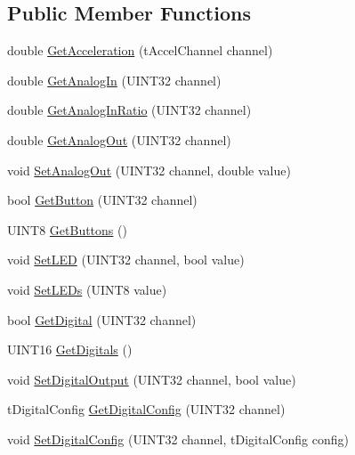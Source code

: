 \subsection*{\-Public \-Member \-Functions}
\begin{DoxyCompactItemize}
\item 
double \hyperlink{classDriverStationEnhancedIO_a594f2ddea855e046abcf50406542a4ca}{\-Get\-Acceleration} (t\-Accel\-Channel channel)
\item 
double \hyperlink{classDriverStationEnhancedIO_a8a4d31fb1c8845f33de2da37c559f016}{\-Get\-Analog\-In} (\-U\-I\-N\-T32 channel)
\item 
double \hyperlink{classDriverStationEnhancedIO_a37c9af7405e84233c47a708be5a3c53a}{\-Get\-Analog\-In\-Ratio} (\-U\-I\-N\-T32 channel)
\item 
double \hyperlink{classDriverStationEnhancedIO_a7cefa1bbdd5c1b7520e0268a17bd75db}{\-Get\-Analog\-Out} (\-U\-I\-N\-T32 channel)
\item 
void \hyperlink{classDriverStationEnhancedIO_ab6888ed427c283821a7b6e7e728486bc}{\-Set\-Analog\-Out} (\-U\-I\-N\-T32 channel, double value)
\item 
bool \hyperlink{classDriverStationEnhancedIO_a8fe07c23d485a9dac1b9821583c539b6}{\-Get\-Button} (\-U\-I\-N\-T32 channel)
\item 
\-U\-I\-N\-T8 \hyperlink{classDriverStationEnhancedIO_a04ed7d81517bc526ef6897a006bd3782}{\-Get\-Buttons} ()
\item 
void \hyperlink{classDriverStationEnhancedIO_a34d6429692d4a27bc384533319e4127b}{\-Set\-L\-E\-D} (\-U\-I\-N\-T32 channel, bool value)
\item 
void \hyperlink{classDriverStationEnhancedIO_a476ebdc37d1dd1fa58ab0a0ec09c1c17}{\-Set\-L\-E\-Ds} (\-U\-I\-N\-T8 value)
\item 
bool \hyperlink{classDriverStationEnhancedIO_ae7cf63b5f341ddb29b9e3ef988374747}{\-Get\-Digital} (\-U\-I\-N\-T32 channel)
\item 
\-U\-I\-N\-T16 \hyperlink{classDriverStationEnhancedIO_a052a9491d9661576d66896a4658e1509}{\-Get\-Digitals} ()
\item 
void \hyperlink{classDriverStationEnhancedIO_a1b17805cb755900f4bc9f34f1444d822}{\-Set\-Digital\-Output} (\-U\-I\-N\-T32 channel, bool value)
\item 
t\-Digital\-Config \hyperlink{classDriverStationEnhancedIO_a8f5de58215d255e84e48723fda4e4c5e}{\-Get\-Digital\-Config} (\-U\-I\-N\-T32 channel)
\item 
void \hyperlink{classDriverStationEnhancedIO_afad555dfa62bf621e92edda0b36613d0}{\-Set\-Digital\-Config} (\-U\-I\-N\-T32 channel, t\-Digital\-Config config)

\end{DoxyCompactItemize}

